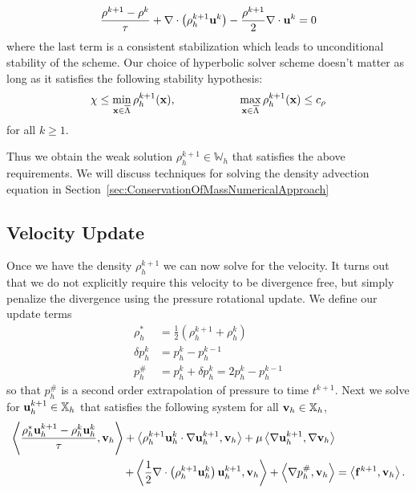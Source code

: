 \documentclass[letterpaper]{erdc}
\begin{document}
\begin{equation}
  \frac{\rho^{k+1} - \rho^k}{\tau} + \nabla\cdot\left(\rho_h^{k+1}\textbf{u}^{k} \right) - \frac{\rho^{k+1}}{2}\nabla\cdot\textbf{u}^{k} = 0
\end{equation}
where the last term is a consistent stabilization which leads to unconditional stability of the scheme.   Our choice of hyperbolic solver scheme doesn't matter as long as it satisfies the following stability hypothesis:
\begin{equation}
  \chi \leq \displaystyle\min_{\textbf{x}\in\overline{\Lambda}} \rho_h^{k+1}(\textbf{x}), \hspace{2cm} \displaystyle\max_{\textbf{x}\in\overline{\Lambda}} \rho_{h}^{k+1}(\textbf{x}) \leq c_{\rho}
\end{equation}
for all $k\geq 1$.

Thus we obtain the weak solution $\rho_h^{k+1}\in \mathbb{W}_h$ that satisfies the above requirements.  We will discuss techniques for solving the density advection equation in Section~\ref{sec:ConservationOfMassNumericalApproach}

%
%
\subsection{Velocity Update}
Once we have the density $\rho_h^{k+1}$ we can now solve for the velocity.  It turns out that we do not explicitly require this velocity to be divergence free, but simply penalize the divergence using the pressure rotational update.  We define our update terms
\begin{align*}
  \rho_h^{*} &= \frac{1}{2}\left( \rho_h^{k+1} + \rho_h^{k} \right)\\
  \delta p_h^{k} &= p_h^{k} - p_h^{k-1}\\
    p_h^{\#} &= p_h^{k} + \delta p_h^{k} = 2p_h^{k} - p_h^{k-1}
\end{align*}
so that $p_h^{\#}$ is a second order extrapolation of pressure to time $t^{k+1}$.  Next we  solve for $\textbf{u}_h^{k+1}\in\mathbb{X}_h$ that satisfies the following system for all $\textbf{v}_h\in\mathbb{X}_h$,
\begin{equation}\label{eqn:bdf1_momentum_constanttimestep}
  \begin{split}
\left\langle  \frac{\rho_h^{*}\textbf{u}_h^{k+1}-\rho_h^{k}\textbf{u}_h^{k} }{\tau} , \textbf{v}_h \right\rangle + \left\langle  \rho_h^{k+1}\textbf{u}_h^{k}\cdot\nabla\textbf{u}_h^{k+1} , \textbf{v}_h \right\rangle+ \mu\left\langle  \nabla \textbf{u}_h^{k+1} , \nabla\textbf{v}_h \right\rangle&\\
 + \left\langle  \frac{1}{2}\nabla\cdot\left(\rho_h^{k+1}\textbf{u}_h^{k}\right)\textbf{u}_h^{k+1} , \textbf{v}_h \right\rangle +\left\langle \nabla p_h^{\#}, \textbf{v}_h \right\rangle &= \left\langle \mathbf{f}^{k+1}, \textbf{v}_h \right\rangle.
\end{split}
\end{equation}
\end{document}
